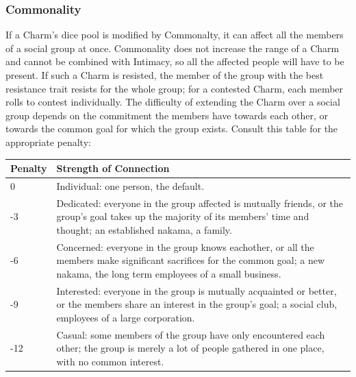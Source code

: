 \subsubsection*{Commonality}

\noindent If a Charm's dice pool is modified by Commonalty, it can affect all the members of a social group at once. Commonality does not increase the range of a Charm and cannot be combined with Intimacy, so all the affected people will have to be present. If such a Charm is resisted, the member of the group with the best resistance trait resists for the whole group; for a contested Charm, each member rolls to contest individually. The difficulty of extending the Charm over a social group depends on the commitment the members have towards each other, or towards the common goal for which the group exists.  Consult this table for the appropriate penalty: 
\begin{table}[H]
    \begin{tabularx}{\textwidth}{|l|X|}
        \hline
        Penalty & Strength of Connection                                                                                                                                                                        \\ \hline
        0       & Individual: one person, the default.                                                                                                                                                          \\ \hline
        -3      & Dedicated: everyone in the group affected is mutually friends, or the group's goal takes up the majority of its members' time and thought; an established nakama, a family.                  \\ \hline
        -6      & Concerned: everyone in the group knows eachother, or all the members make significant sacrifices for the common goal; a new nakama, the long term employees of a small business.  \\ \hline
        -9      & Interested: everyone in the group is mutually acquainted or better, or the members share an interest in the group's goal; a social club, employees of a large corporation.                    \\ \hline
        -12     & Casual: some members of the group have only encountered each other; the group is merely a lot of people gathered in one place, with no common interest.                                       \\
        \hline
    \end{tabularx}
\end{table}

